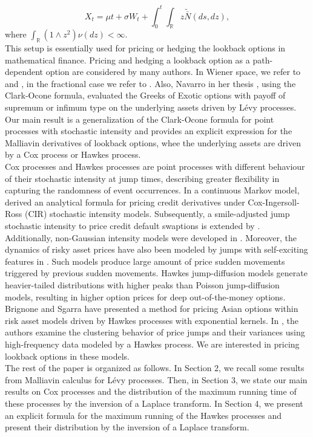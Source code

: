 \documentclass[11pt]{article}
\numberwithin{equation}{section}
\begin{document}
$$X_t= \mu t+\sigma W_t+ \int_0^t \int_{\mathbb{R}} z \tilde{\bar{N}}(ds,dz),$$
 where $\int_{\mathbb{R}} (1\wedge z^2) \nu(dz) < \infty$.\\
This setup is essentially used for pricing or hedging the lookback options in mathematical finance. 
Pricing and hedging a lookback option as a path-dependent option are considered by many authors. In Wiener space, we refer to \cite{bermin} and \cite{gobet}, in the fractional case we refer to \cite{Liu}.  
Also, Navarro in her thesis \cite{navarro}, using the Clark-Ocone formula, evaluated the Greeks of Exotic options with payoff of supremum or infimum type on the underlying assets driven by Lévy processes.     \\
Our main result is a generalization of the Clark-Ocone formula for point processes with stochastic intensity and provides an explicit expression for the Malliavin derivatives of lookback options, whee the underlying assets are driven by a Cox process or Hawkes process.\\ 
Cox processes and Hawkes processes are point processes with different behaviour of their stochastic intensity at jump times, describing greater flexibility in capturing the randomness of event occurrences. In a continuous Markov model, \cite{Damiano} derived an analytical formula for pricing credit derivatives under Cox-Ingersoll-Ross (CIR) stochastic intensity models. Subsequently, a smile-adjusted jump stochastic intensity to price credit default swaptions is extended by  \cite{brigo}. Additionally, non-Gaussian intensity models were developed in \cite{bianchi}. Moreover, the dynamics of risky asset prices have also  been modeled by jumps with self-exciting features in \cite{Filimonov et al. (2014)}. Such models produce large amount of price sudden movements triggered by previous sudden movements. Hawkes jump-diffusion models generate heavier-tailed distributions with higher peaks than Poisson jump-diffusion models, resulting in higher option prices for deep out-of-the-money options. 
Brignone and Sgarra \cite{brignone2020asian} have presented a method for pricing Asian options within risk asset models driven by Hawkes processes with exponential kernels.
In \cite{chen2024modeling}, the authors examine the clustering behavior of price jumps and their variances using high-frequency data modeled by a Hawkes process. We are interested in pricing lookback options in these models.\\
The rest of the paper is organized as follows. In Section 2, we recall some results from Malliavin calculus for Lévy processes.  Then, in Section 3, we state our main results on Cox processes and the distribution of the maximum running time of these processes by the inversion of a Laplace transform. In Section 4, we present an explicit formula for the maximum running of the Hawkes processes and present their distribution by the inversion of a Laplace transform.
\end{document}
